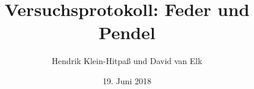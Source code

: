 \documentclass[ngerman,
    paper=a4,
    ]{article}
\title{Versuchsprotokoll: Feder und Pendel}
\author{Hendrik Klein-Hitpaß und David van Elk}
\date{19. Juni 2018}
\begin{document}
    \maketitle
    \tableofcontents
    \pagebreak

    
    
    
    
    
    
    
\end{document}
